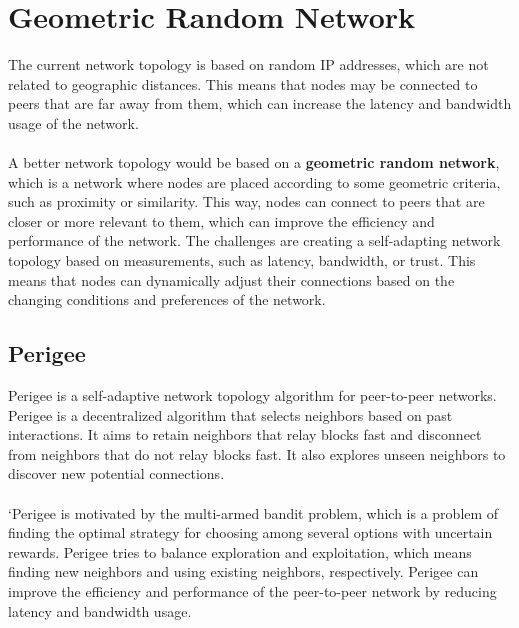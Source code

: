 \section{Geometric Random Network}
The current network topology is based on random IP addresses, which are not related to geographic distances. This means that nodes may be connected to peers that are far away from them, which can increase the latency and bandwidth usage of the network. \\\\
A better network topology would be based on a \textbf{geometric random network}, which is a network where nodes are placed according to some geometric criteria, such as proximity or similarity. This way, nodes can connect to peers that are closer or more relevant to them, which can improve the efficiency and performance of the network. The challenges are creating a self-adapting network topology based on measurements, such as latency, bandwidth, or trust. This means that nodes can dynamically adjust their connections based on the changing conditions and preferences of the network.

\subsection{Perigee}
Perigee is a self-adaptive network topology algorithm for peer-to-peer networks. Perigee is a decentralized algorithm that selects neighbors based on past interactions. It aims to retain neighbors that relay blocks fast and disconnect from neighbors that do not relay blocks fast. It also explores unseen neighbors to discover new potential connections.\\\\
`Perigee is motivated by the multi-armed bandit problem, which is a problem of finding the optimal strategy for choosing among several options with uncertain rewards. Perigee tries to balance exploration and exploitation, which means finding new neighbors and using existing neighbors, respectively. Perigee can improve the efficiency and performance of the peer-to-peer network by reducing latency and bandwidth usage.

